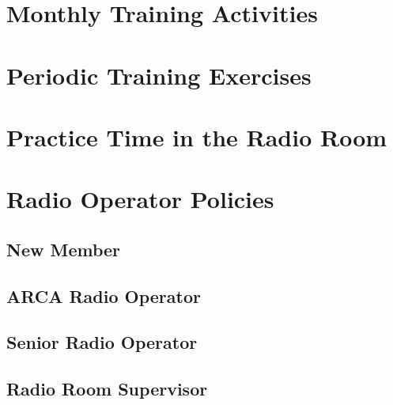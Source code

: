 \documentclass[pdflatex,letterpaper,twoside,12pt]{book}
\begin{document}
\section{Monthly Training Activities}


\section{Periodic Training Exercises}


\section{Practice Time in the Radio Room}


\section{Radio Operator Policies}

\subsection{New Member}

\subsection{ARCA Radio Operator}

\subsection{Senior Radio Operator}

\subsection{Radio Room Supervisor}

\end{document}
